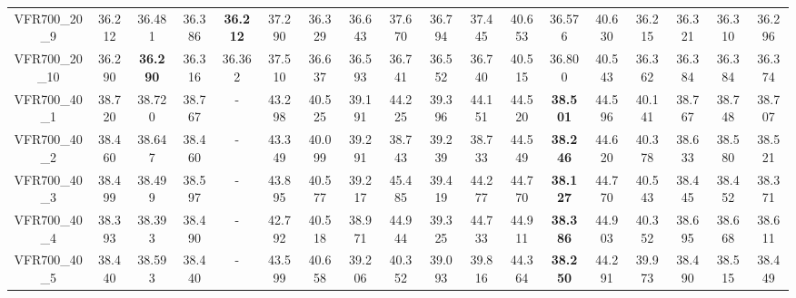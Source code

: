 \begin{tabular}{cc|ccc|ccccccccccccc}
VFR700\_20\_9      & 36.212           & 36.481           & 36.386           & {\bf 36.212}     & 37.290           & 36.329           & 36.643           & 37.670           & 36.794           & 37.445           & 40.653           & 36.576           & 40.630           & 36.215           & 36.321           & 36.310           & 36.296          \\ 
VFR700\_20\_10     & 36.290           & {\bf 36.290}     & 36.316           & 36.362           & 37.510           & 36.637           & 36.593           & 36.741           & 36.552           & 36.740           & 40.515           & 36.800           & 40.543           & 36.362           & 36.384           & 36.384           & 36.374          \\ 
VFR700\_40\_1      & 38.720           & 38.720           & 38.767           & -                & 43.298           & 40.525           & 39.191           & 44.225           & 39.396           & 44.151           & 44.520           & {\bf 38.501}     & 44.596           & 40.141           & 38.767           & 38.748           & 38.707          \\ 
VFR700\_40\_2      & 38.460           & 38.647           & 38.460           & -                & 43.349           & 40.099           & 39.291           & 38.743           & 39.239           & 38.733           & 44.549           & {\bf 38.246}     & 44.620           & 40.378           & 38.633           & 38.580           & 38.521          \\ 
VFR700\_40\_3      & 38.499           & 38.499           & 38.597           & -                & 43.895           & 40.577           & 39.217           & 45.485           & 39.419           & 44.277           & 44.770           & {\bf 38.127}     & 44.770           & 40.543           & 38.445           & 38.452           & 38.371          \\ 
VFR700\_40\_4      & 38.393           & 38.393           & 38.490           & -                & 42.792           & 40.518           & 38.971           & 44.944           & 39.325           & 44.733           & 44.911           & {\bf 38.386}     & 44.903           & 40.352           & 38.695           & 38.668           & 38.611          \\ 
VFR700\_40\_5      & 38.440           & 38.593           & 38.440           & -                & 43.599           & 40.658           & 39.206           & 40.352           & 39.093           & 39.816           & 44.364           & {\bf 38.250}     & 44.291           & 39.973           & 38.490           & 38.515           & 38.449          \\ 

\end{tabular}
